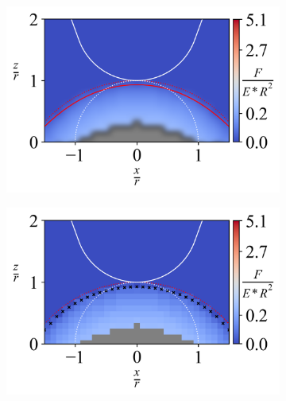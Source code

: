 \begin{figure}[H]
    
    \begin{subfigure}{0.32\textwidth}
        \centering
        \caption{\label{fig: All-Hemisphere-ContourPlot-5}}
        \includegraphics[width=1\linewidth]{Figures/Hemisphere-ContourPlot-5.png}
    \end{subfigure}   
    \hfill
   \begin{subfigure}{0.32\textwidth}
        \centering
        \caption{\label{fig: All-Hemisphere-ContourPlotNI-5}}
        \includegraphics[width=1\linewidth]{Figures/Hemisphere-ContourPlotNI-5.png}
    \end{subfigure}   
    \hfill    
    \begin{subfigure}{0.32\textwidth}
        \centering
        \caption{\label{fig: All-Hemisphere-LineContour-5}}

\end{subfigure}
\end{figure}
